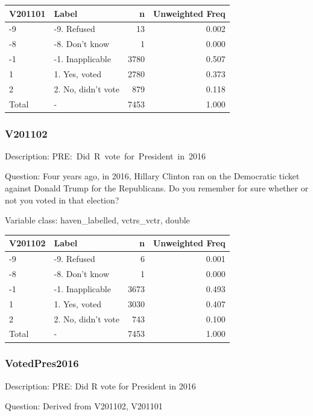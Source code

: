 \documentclass[
]{krantz}
\begin{document}
\begin{tabular}[t]{l|l|r|r}
\hline
V201101 & Label & n & Unweighted Freq\\
\hline
-9 & -9. Refused & 13 & 0.002\\
\hline
-8 & -8. Don't know & 1 & 0.000\\
\hline
-1 & -1. Inapplicable & 3780 & 0.507\\
\hline
1 & 1. Yes, voted & 2780 & 0.373\\
\hline
2 & 2. No, didn't vote & 879 & 0.118\\
\hline
Total & - & 7453 & 1.000\\
\hline
\end{tabular}

\hypertarget{v201102}{%
\subsubsection*{V201102}\label{v201102}}


Description: PRE:~Did~R~vote~for~President~in~2016

Question: Four years ago, in 2016, Hillary Clinton ran on the Democratic ticket against Donald Trump for the Republicans. Do you remember for sure whether or not you voted in that election?

Variable class: haven\_labelled, vctrs\_vctr, double

\begin{tabular}[t]{l|l|r|r}
\hline
V201102 & Label & n & Unweighted Freq\\
\hline
-9 & -9. Refused & 6 & 0.001\\
\hline
-8 & -8. Don't know & 1 & 0.000\\
\hline
-1 & -1. Inapplicable & 3673 & 0.493\\
\hline
1 & 1. Yes, voted & 3030 & 0.407\\
\hline
2 & 2. No, didn't vote & 743 & 0.100\\
\hline
Total & - & 7453 & 1.000\\
\hline
\end{tabular}

\hypertarget{votedpres2016}{%
\subsubsection*{VotedPres2016}\label{votedpres2016}}


Description: PRE: Did R vote for President in 2016

Question: Derived from V201102, V201101
\end{document}
